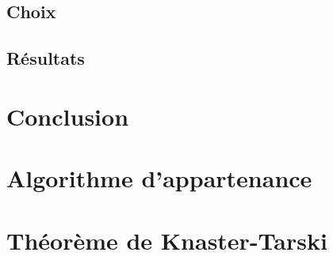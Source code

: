 	\section{Choix}\label{sec:choix}
	\section{Résultats}\label{sec:res}

	\chapter{Conclusion}\label{ch:ccl}


	\newpage
	
	

	\appendix
	\chapter{Algorithme d'appartenance}\label{app:membership}
	\chapter{Théorème de Knaster-Tarski}\label{app:tarski}


